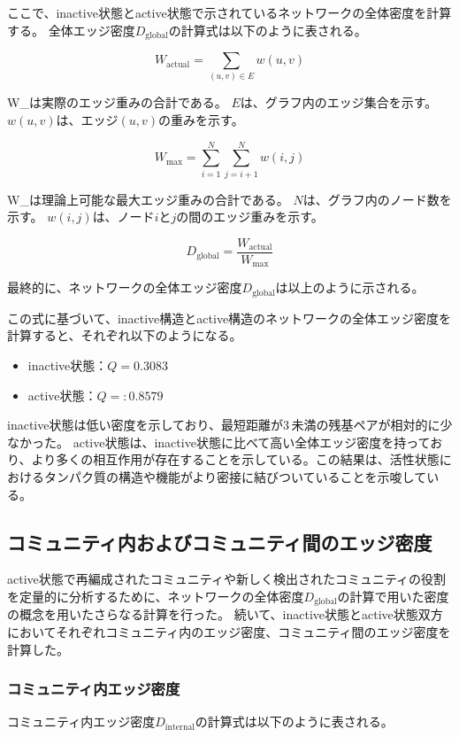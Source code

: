 ここで、inactive状態とactive状態で示されているネットワークの全体密度を計算する。
全体エッジ密度$D_{\text{global}}$の計算式は以下のように表される。

\[
W_{\text{actual}} = \sum_{(u, v) \in E} w(u, v)
\]

W_{}は実際のエッジ重みの合計である。
$E$は、グラフ内のエッジ集合を示す。
$w(u, v)$は、エッジ$(u, v)$の重みを示す。

\[
W_{\text{max}} = \sum_{i=1}^{N} \sum_{j=i+1}^{N} w(i, j)
\]

W_{}は理論上可能な最大エッジ重みの合計である。
$N$は、グラフ内のノード数を示す。
$w(i, j)$は、ノード$i$と$j$の間のエッジ重みを示す。

\[
D_{\text{global}} = \frac{W_{\text{actual}}}{W_{\text{max}}}
\label{eq:global_density}
\]

最終的に、ネットワークの全体エッジ密度$D_{\text{global}}$は以上のように示される。

この式に基づいて、inactive構造とactive構造のネットワークの全体エッジ密度を計算すると、それぞれ以下のようになる。
\begin{itemize}
    \item inactive状態：\( Q = 0.3083 \)
    \item active状態：\( Q = :0.8579 \)
\end{itemize}

inactive状態は低い密度を示しており、最短距離が3\,\text{\AA}未満の残基ペアが相対的に少なかった。
active状態は、inactive状態に比べて高い全体エッジ密度を持っており、より多くの相互作用が存在することを示している。この結果は、活性状態におけるタンパク質の構造や機能がより密接に結びついていることを示唆している。

\subsection{コミュニティ内およびコミュニティ間のエッジ密度}
active状態で再編成されたコミュニティや新しく検出されたコミュニティの役割を定量的に分析するために、ネットワークの全体密度$D_{\text{global}}$の計算で用いた密度の概念を用いたさらなる計算を行った。
続いて、inactive状態とactive状態双方においてそれぞれコミュニティ内のエッジ密度、コミュニティ間のエッジ密度を計算した。

\subsubsection{コミュニティ内エッジ密度}
コミュニティ内エッジ密度$D_{\text{internal}}$の計算式は以下のように表される。

